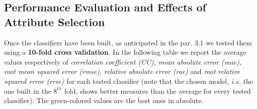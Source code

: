 \subsection{Performance Evaluation and Effects of Attribute Selection}
Once the classifiers have been built, as anticipated in the par. 3.1 we tested them using a \textbf{10-fold cross validation}. 
In the following table we report the average values respectively of \textit{correlation coefficient (CC), mean absolute error (mae), root mean squared error (rmse), relative absolute error (rae)} and \textit{root relative squared error (rrse)} for each tested classifier (note that the chosen model, \textit{i.e.} the one built in the $8^{th}$ fold, shows better measures than the average for every tested classifier).
The green-colored values are the best ones in absolute.


\begingroup
\setlength{\tabcolsep}{6pt} %
\renewcommand{\arraystretch}{1.5} %

